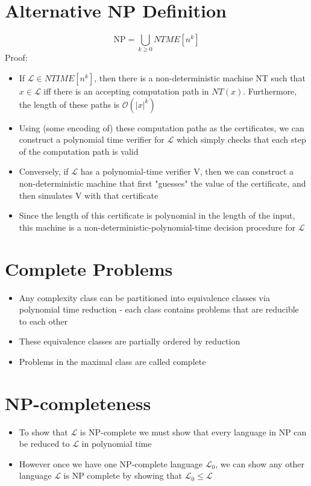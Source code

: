 \documentclass{article}[18pt]
\begin{document}
\section{Alternative NP Definition}
\[
\mathrm{NP}=\bigcup_{k \geq 0} N T M E\left[n^{k}\right]
\]
Proof:
\begin{itemize}
	\item If $\mathcal{L}\in NTIME[n^k]$, then there is a non-deterministic machine NT such that $x\in\mathcal{L}$ iff there is an accepting computation path in $NT(x)$. Furthermore, the length of these paths is $\mathcal{O}(|x|^k)$
	\item Using (some encoding of) these computation paths as the certificates, we can construct a polynomial time verifier for $\mathcal{L}$ which simply checks that each step of the computation path is valid
	\item Conversely, if $\mathcal{L}$ has a polynomial-time verifier V, then we can construct a non-deterministic machine that first "guesses" the value of the certificate, and then simulates V with that certificate
	\item Since the length of this certificate is polynomial in the length of the input, this machine is a non-deterministic-polynomial-time decision procedure for $\mathcal{L}$
\end{itemize}
\section{Complete Problems}
\begin{itemize}
	\item Any complexity class can be partitioned into equivalence classes via polynomial time reduction - each class contains problems that are reducible to each other
	\item These equivalence classes are partially ordered by reduction
	\item Problems in the maximal class are called complete
\end{itemize}
\section{NP-completeness}
\begin{itemize}
	\item To show that $\mathcal{L}$ is NP-complete we must show that every language in NP can be reduced to $\mathcal{L}$ in polynomial time
	\item However once we have one NP-complete language $\mathcal{L}_0$, we can show any other language $\mathcal{L}$ is NP complete by showing that $\mathcal{L}_0\leqslant \mathcal{L}$
\end{itemize}
\end{document}
